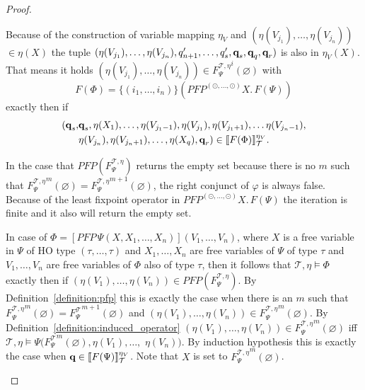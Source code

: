 \begin{proof}
\begin{compactitem}
		Because of the construction of variable mapping $\eta_V$ and $(\eta(V_{j_1}), \dots, 
        \eta(V_{j_n}))$ $ \in \eta(X)$ the
        tuple $(\eta(V_{j_1}), \dots, \eta(V_{j_n}), q_{n+1}', \dots, q_s', \emph{q}_s, 
        \emph{q}_q,  \emph{q}_r)$ is also in $\eta_V(X)$.
         That means it holds $(\eta(V_{j_1}), \dots, \eta(V_{j_n})) \in {F_\Psi^{\mathcal{T},\eta}}^i(\varnothing)$ with
        \[F(\Phi) = \{(i_1, \dots, i_n)\} (PFP^{(\odot, \dots, \odot)} X.\, F(\Psi)) \]
        exactly then if
        \begin{align*}
        (\emph{q}_s, &\emph{q}_s, \eta(X_1), \dots, \eta(V_{j_1-1}), \eta(V_{j_1}), \eta(V_{j_1+1}), \dots \eta(V_{j_n-1}),\\& \eta(V_{j_n}), \eta(V_{j_n+1}), \dots, \eta
            (X_q), \emph{q}_r) \in \llbracket F(\Phi) \rrbracket_\mathcal{T}^{\eta_V}.
        \end{align*}
        
        In the case that $PFP(F_\Psi^{\mathcal{T},\eta})$ returns the empty set because there is no $m$ such that ${F_\Psi^{\mathcal{T},\eta}}^m(\varnothing) = {F_\Psi^		
       {\mathcal{T},\eta}}^{m+1}(\varnothing)$, the right conjunct of $\varphi$ is always false. Because of the least fixpoint operator in $PFP^{(\odot, \dots, \odot)} X.\, F(\Psi)$ the iteration is finite and it also will return the empty set.

        \item In case of $\Phi = [PFP\,\Psi(X, X_1, \dots, X_n)](V_1, \dots, V_n)$, where $X$ is a
        free variable in $\Psi$ of HO type $(\tau, \dots, \tau)$ and $X_1, \dots, X_n$ are free 
        variables of $\Psi$ of type $\tau$ and $V_1, \dots, V_n$ are free variables of $\Phi$ also of 
        type $\tau$, then it follows that $\mathcal{T}, \eta \models \Phi$ exactly then if $(\eta(V_1), 
        \dots, \eta(V_n)) \in PFP(F_\Psi^{\mathcal{T},\eta})$. By Definition~\ref{definition:pfp} this is exactly the 
        case when there is an $m$ such that ${F_\Psi^{\mathcal{T},\eta}}^m(\varnothing) = {F_\Psi^		
        \mathcal{T}}^{m+1}(\varnothing)$ and $(\eta(V_1), \dots, \eta(V_n)) \in {F_\Psi^{\mathcal{T},\eta}}
        ^m(\varnothing)$. By Definition~\ref{definition:induced_operator} $(\eta(V_1), \dots, 		
        \eta(V_n)) \in {F_\Psi^{\mathcal{T},\eta}}^m(\varnothing)$ iff $\mathcal{T}, \eta \models \Psi({F_\Psi^
        \mathcal{T}}^{m}(\varnothing), \eta(V_1), \dots, $ $\eta(V_n))$. By induction hypothesis 
        this is exactly the case when $\emph{q} \in \llbracket F(\Psi) \rrbracket_\mathcal{T}
        ^{\eta_V}$. Note that $X$ is set to ${F_\Psi^{\mathcal{T},\eta}}^{m}(\varnothing)$.
		         

\end{compactitem}
\end{proof}
